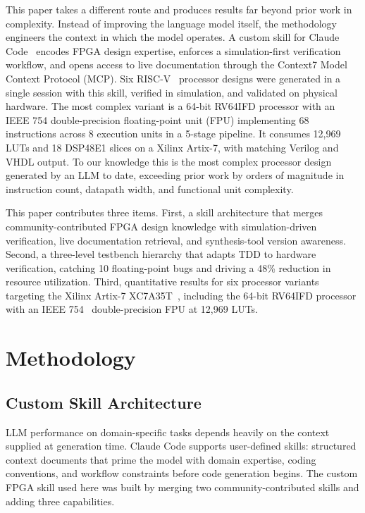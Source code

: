 \documentclass[journal]{IEEEtran}
\begin{document}
This paper takes a different route and produces results far beyond prior work in complexity. Instead of improving the language model itself, the methodology engineers the context in which the model operates. A custom skill for Claude Code~\cite{anthropic2026claude} encodes FPGA design expertise, enforces a simulation-first verification workflow, and opens access to live documentation through the Context7 Model Context Protocol (MCP). Six RISC-V~\cite{waterman2019riscv} processor designs were generated in a single session with this skill, verified in simulation, and validated on physical hardware. The most complex variant is a 64-bit RV64IFD processor with an IEEE 754 double-precision floating-point unit (FPU) implementing 68 instructions across 8 execution units in a 5-stage pipeline. It consumes 12,969 LUTs and 18 DSP48E1 slices on a Xilinx Artix-7, with matching Verilog and VHDL output. To our knowledge this is the most complex processor design generated by an LLM to date, exceeding prior work by orders of magnitude in instruction count, datapath width, and functional unit complexity.

This paper contributes three items. First, a skill architecture that merges community-contributed FPGA design knowledge with simulation-driven verification, live documentation retrieval, and synthesis-tool version awareness. Second, a three-level testbench hierarchy that adapts TDD to hardware verification, catching 10 floating-point bugs and driving a 48\% reduction in resource utilization. Third, quantitative results for six processor variants targeting the Xilinx Artix-7 XC7A35T~\cite{xilinx2020ds180}, including the 64-bit RV64IFD processor with an IEEE 754~\cite{ieee754_2019} double-precision FPU at 12,969 LUTs.

\section{Methodology}

\subsection{Custom Skill Architecture}

LLM performance on domain-specific tasks depends heavily on the context supplied at generation time. Claude Code supports user-defined skills: structured context documents that prime the model with domain expertise, coding conventions, and workflow constraints before code generation begins. The custom FPGA skill used here was built by merging two community-contributed skills and adding three capabilities.
\end{document}
